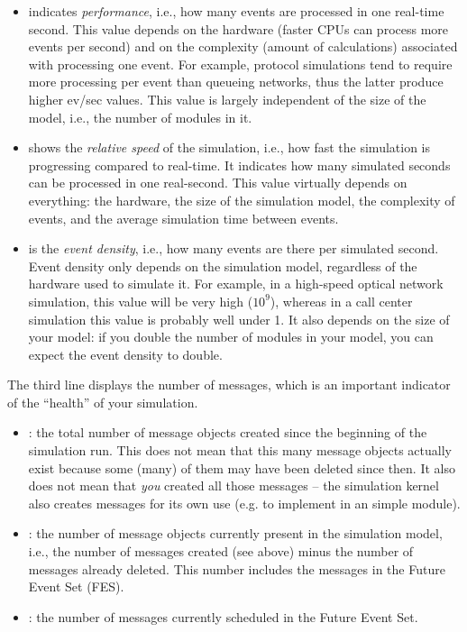 \begin{itemize}
   \item {} indicates \textit{performance}, i.e., how many events are
     processed in one real-time second. This value depends on the hardware
     (faster CPUs can process more events per second) and on the complexity
     (amount of calculations) associated with processing one event. For example,
     protocol simulations tend to require more processing per event than queueing
     networks, thus the latter produce higher ev/sec values. This value is largely
     independent of the size of the model, i.e., the number of modules in it.
   \item {} shows the \textit{relative speed} of the simulation, i.e.,
     how fast the simulation is progressing compared to real-time. It indicates how many
     simulated seconds can be processed in one real-second. This value virtually depends
     on everything: the hardware, the size of the simulation model, the complexity of events,
     and the average simulation time between events.
   \item {} is the \textit{event density}, i.e., how many events are
     there per simulated second. Event density only depends on the simulation model,
     regardless of the hardware used to simulate it. For example, in a high-speed
     optical network simulation, this value will be very high ($10^9$), whereas
     in a call center simulation this value is probably well under 1. It also
     depends on the size of your model: if you double the number of modules in
     your model, you can expect the event density to double.
\end{itemize}

The third line displays the number of messages, which is an important
indicator of the ``health'' of your simulation.

\begin{itemize}
   \item{: the total number of message objects created since the
     beginning of the simulation run. This does not mean that this many message
     objects actually exist because some (many) of them may have been deleted
     since then. It also does not mean that \textit{you} created all those
     messages -- the simulation kernel also creates messages for its own use
     (e.g. to implement  in an  simple module).}
   \item{: the number of message objects currently present
     in the simulation model, i.e., the number of messages created (see above)
     minus the number of messages already deleted. This number includes
     the messages in the Future Event Set (FES).}
   \item{: the number of messages currently scheduled in the
     Future Event Set.}
\end{itemize}


